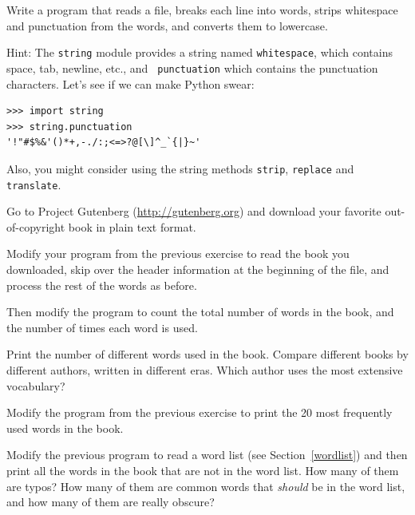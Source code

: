 \documentclass[10pt]{book}
\begin{document}
\begin{exercise}

Write a program that reads a file, breaks each line into
words, strips whitespace and punctuation from the words, and
converts them to lowercase.

Hint: The {\tt string} module provides a string named {\tt whitespace},
which contains space, tab, newline, etc., and {\tt
  punctuation} which contains the punctuation characters.  Let's see
if we can make Python swear:

\begin{verbatim}
>>> import string
>>> string.punctuation
'!"#$%&'()*+,-./:;<=>?@[\]^_`{|}~'
\end{verbatim}
%
Also, you might consider using the string methods {\tt strip},
{\tt replace} and {\tt translate}.

\end{exercise}


\begin{exercise}

Go to Project Gutenberg (\url{http://gutenberg.org}) and download 
your favorite out-of-copyright book in plain text format.

Modify your program from the previous exercise to read the book
you downloaded, skip over the header information at the beginning
of the file, and process the rest of the words as before.

Then modify the program to count the total number of words in
the book, and the number of times each word is used.

Print the number of different words used in the book.  Compare
different books by different authors, written in different eras.
Which author uses the most extensive vocabulary?
\end{exercise}


\begin{exercise}

Modify the program from the previous exercise to print the
20 most frequently used words in the book.

\end{exercise}


\begin{exercise}

Modify the previous program to read a word list (see
Section~\ref{wordlist}) and then print all the words in the book that
are not in the word list.  How many of them are typos?  How many of
them are common words that {\em should} be in the word list, and how
many of them are really obscure?

\end{exercise}
\end{document}
